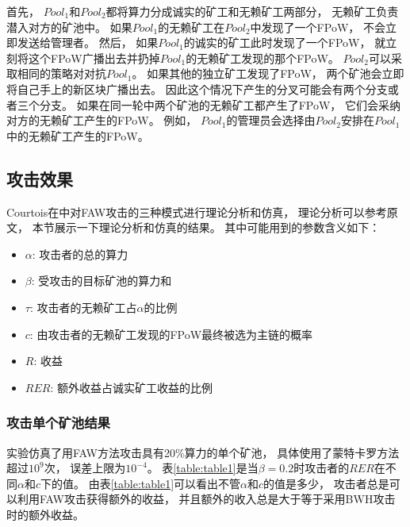 \documentclass[a4paper, 11pt]{article}
\begin{document}
\begin{CJK*}{UTF8}{gbsn}
    首先，
    $Pool_1$和$Pool_2$都将算力分成诚实的矿工和无赖矿工两部分，
    无赖矿工负责潜入对方的矿池中。
    如果$Pool_1$的无赖矿工在$Pool_2$中发现了一个FPoW，
    不会立即发送给管理者。
    然后，
    如果$Pool_1$的诚实的矿工此时发现了一个FPoW，
    就立刻将这个FPoW广播出去并扔掉$Pool_1$的无赖矿工发现的那个FPoW。
    $Pool_2$可以采取相同的策略对对抗$Pool_1$。  
    如果其他的独立矿工发现了FPoW，
    两个矿池会立即将自己手上的新区块广播出去。
    因此这个情况下产生的分叉可能会有两个分支或者三个分支。
    如果在同一轮中两个矿池的无赖矿工都产生了FPoW，
    它们会采纳对方的无赖矿工产生的FPoW。
    例如，
    $Pool_1$的管理员会选择由$Pool_2$安排在$Pool_1$中的无赖矿工产生的FPoW。

    \subsection{攻击效果}

    \indent

    Courtois在\cite{ref_FAW}中对FAW攻击的三种模式进行理论分析和仿真，
    理论分析可以参考原文，
    本节展示一下理论分析和仿真的结果。
    其中可能用到的参数含义如下：

    \begin{itemize}
        \item $\alpha$: 攻击者的总的算力 
        \item $\beta$: 受攻击的目标矿池的算力和
        \item $\tau$: 攻击者的无赖矿工占$\alpha$的比例
        \item $c$: 由攻击者的无赖矿工发现的FPoW最终被选为主链的概率
        \item $R$: 收益
        \item $RER$: 额外收益占诚实矿工收益的比例
    \end{itemize}

    \subsubsection{攻击单个矿池结果}

    \indent

    实验仿真了用FAW方法攻击具有20\%算力的单个矿池，
    具体使用了蒙特卡罗方法超过$10^9$次，
    误差上限为$10^{-4}$。
    表\ref{table:table1}是当$\beta=0.2$时攻击者的$RER$在不同$\alpha$和$c$下的值。
    由表\ref{table:table1}可以看出不管$\alpha$和$c$的值是多少，
    攻击者总是可以利用FAW攻击获得额外的收益，
    并且额外的收入总是大于等于采用BWH攻击时的额外收益。



\end{CJK*}
\end{document}
